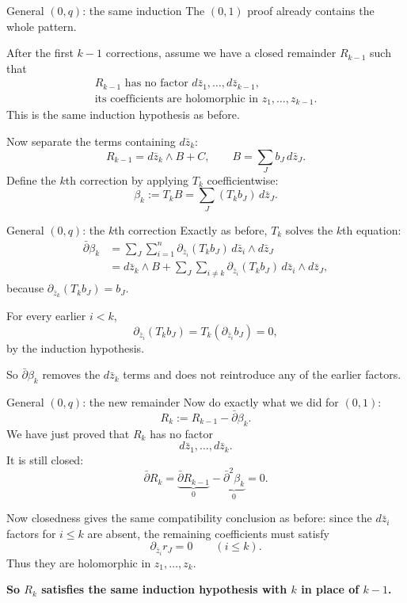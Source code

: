 \documentclass[aspectratio=169,11pt]{beamer}
\newcommand{\db}{\bar\partial}
\begin{document}
\begin{frame}{General $(0,q)$: the same induction}
The $(0,1)$ proof already contains the whole pattern.

After the first $k-1$ corrections, assume we have a closed remainder
$R_{k-1}$ such that
\[
\boxed{
\begin{array}{l}
R_{k-1}\text{ has no factor }d\bar z_1,\ldots,d\bar z_{k-1},\\[2pt]
\text{its coefficients are holomorphic in }z_1,\ldots,z_{k-1}.
\end{array}}
\]
This is the same induction hypothesis as before.

Now separate the terms containing $d\bar z_k$:
\[
R_{k-1}=d\bar z_k\wedge B+C,
\qquad
B=\sum_J b_J\,d\bar z_J.
\]
Define the $k$th correction by applying $T_k$ coefficientwise:
\[
\boxed{\beta_k:=T_kB=\sum_J(T_kb_J)\,d\bar z_J.}
\]
\end{frame}

\begin{frame}{General $(0,q)$: the $k$th correction}
Exactly as before, $T_k$ solves the $k$th equation:
\[
\begin{aligned}
\db\beta_k
&=\sum_J\sum_{i=1}^n
 \partial_{\bar z_i}(T_kb_J)\,
 d\bar z_i\wedge d\bar z_J\\
&=d\bar z_k\wedge B
 +\sum_J\sum_{i\ne k}
 \partial_{\bar z_i}(T_kb_J)\,
 d\bar z_i\wedge d\bar z_J,
\end{aligned}
\]
because $\partial_{\bar z_k}(T_kb_J)=b_J$.

For every earlier $i<k$,
\[
\partial_{\bar z_i}(T_kb_J)
=T_k(\partial_{\bar z_i}b_J)=0,
\]
by the induction hypothesis.

So $\db\beta_k$ removes the $d\bar z_k$ terms and does not
reintroduce any of the earlier factors.
\end{frame}

\begin{frame}{General $(0,q)$: the new remainder}
Now do exactly what we did for $(0,1)$:
\[
\boxed{R_k:=R_{k-1}-\db\beta_k.}
\]
We have just proved that $R_k$ has no factor
\[
d\bar z_1,\ldots,d\bar z_k.
\]
It is still closed:
\[
\db R_k
=\underbrace{\db R_{k-1}}_{0}
 -\underbrace{\db^2\beta_k}_{0}
=0.
\]

Now closedness gives the same compatibility conclusion as before:
since the $d\bar z_i$ factors for $i\le k$ are absent,
the remaining coefficients must satisfy
\[
\boxed{\partial_{\bar z_i}r_J=0\qquad(i\le k).}
\]
Thus they are holomorphic in $z_1,\ldots,z_k$.

\textbf{So $R_k$ satisfies the same induction hypothesis with $k$
in place of $k-1$.}
\end{frame}
\end{document}
